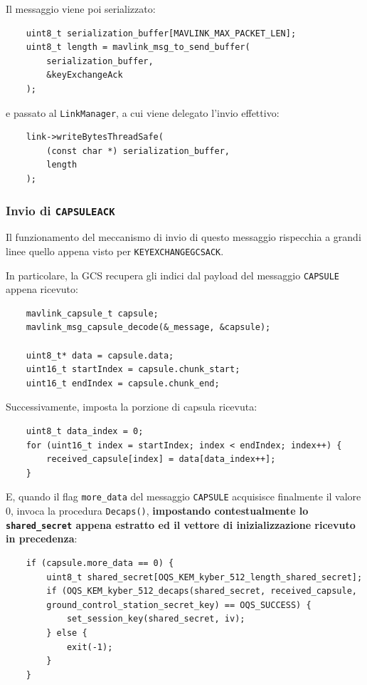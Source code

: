 \documentclass[a4paper, 12pt, oneside]{article}
\theoremstyle{definition}
\begin{document}
Il messaggio viene poi serializzato:

\begin{verbatim}
    uint8_t serialization_buffer[MAVLINK_MAX_PACKET_LEN];
    uint8_t length = mavlink_msg_to_send_buffer(
        serialization_buffer, 
        &keyExchangeAck
    );
\end{verbatim}

e passato al \texttt{LinkManager}, a cui viene delegato l'invio effettivo:

\begin{verbatim}
    link->writeBytesThreadSafe(
        (const char *) serialization_buffer, 
        length
    );
\end{verbatim}

\subsubsection{Invio di \texttt{CAPSULEACK}}
Il funzionamento del meccanismo di invio di questo messaggio rispecchia a grandi linee quello appena visto per \texttt{KEYEXCHANGEGCSACK}.

In particolare, la GCS recupera gli indici dal payload del messaggio \texttt{CAPSULE} appena ricevuto:

\begin{verbatim}
    mavlink_capsule_t capsule;
    mavlink_msg_capsule_decode(&_message, &capsule);

    uint8_t* data = capsule.data;
    uint16_t startIndex = capsule.chunk_start;
    uint16_t endIndex = capsule.chunk_end;
\end{verbatim}

Successivamente, imposta la porzione di capsula ricevuta:

\begin{verbatim}
    uint8_t data_index = 0;
    for (uint16_t index = startIndex; index < endIndex; index++) {
        received_capsule[index] = data[data_index++];
    }
\end{verbatim}

E, quando il flag \texttt{more\_data} del messaggio \texttt{CAPSULE} acquisisce finalmente il valore 0, invoca la procedura \texttt{Decaps()}, \textbf{impostando contestualmente lo \texttt{shared\_secret} appena estratto ed il vettore di inizializzazione ricevuto in precedenza}:

\begin{verbatim}
    if (capsule.more_data == 0) {
        uint8_t shared_secret[OQS_KEM_kyber_512_length_shared_secret];
        if (OQS_KEM_kyber_512_decaps(shared_secret, received_capsule,
        ground_control_station_secret_key) == OQS_SUCCESS) {
            set_session_key(shared_secret, iv);
        } else {
            exit(-1);
        }
    }
\end{verbatim}
\end{document}

